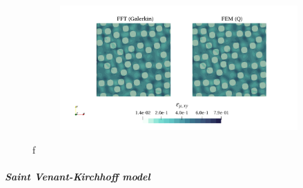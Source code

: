 \begin{figure}[hbt]
\begin{subfigure}[b]{0.49\textwidth}
    \caption{}
    \label{subfig:hencky_2D_shear_cpu_time_vs_n_voxels}
  \end{subfigure}
  \begin{subfigure}[b]{\textwidth}
    \centering
    \includegraphics[width=\textwidth]{figures/hencky_2D_shear_strain_12}
    \caption{}
    \label{subfig:hencky_2D_shear_strain_12}
  \end{subfigure}
  \caption{f}
\label{fig:hencky_2D_shear}
\end{figure}

\begin{figure}[hbt] %
\label{fig:hencky_mat_res_2D_normal}
\end{figure}

\begin{figure}[hbt] %
\label{fig:hencky_mat_res_2D_shear}
\end{figure}

\begin{figure}[hbt] %
\label{fig:hencky_mat_res_3D_normal}
\end{figure}

\begin{figure}[hbt] %
\label{fig:hencky_mat_res_3D_shear}
\end{figure}

\FloatBarrier

\subparagraph{Saint Venant-Kirchhoff model}

